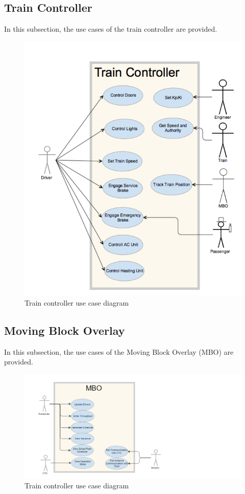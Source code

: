 \documentclass[]{article}
\begin{document}
\subsection{Train Controller}
In this subsection, the use cases of the train controller are provided.

\begin{figure}[H]
	\centering
	\includegraphics[scale=.2]{traincontrollerusecase.png}
	\caption{Train controller use case diagram}
\end{figure}

\subsection{Moving Block Overlay}
In this subsection, the use cases of the Moving Block Overlay (MBO) are provided.

\begin{figure}[H]
	\centering
	\includegraphics[scale=.2]{mbousecase.png}
	\caption{Train controller use case diagram}
\end{figure}
\end{document}
